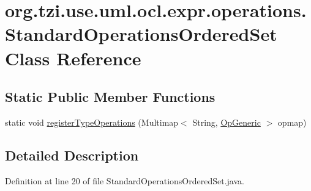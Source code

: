 \hypertarget{classorg_1_1tzi_1_1use_1_1uml_1_1ocl_1_1expr_1_1operations_1_1_standard_operations_ordered_set}{\section{org.\-tzi.\-use.\-uml.\-ocl.\-expr.\-operations.\-Standard\-Operations\-Ordered\-Set Class Reference}
\label{classorg_1_1tzi_1_1use_1_1uml_1_1ocl_1_1expr_1_1operations_1_1_standard_operations_ordered_set}
}
\subsection*{Static Public Member Functions}
\begin{DoxyCompactItemize}
\item 
static void \hyperlink{classorg_1_1tzi_1_1use_1_1uml_1_1ocl_1_1expr_1_1operations_1_1_standard_operations_ordered_set_a12a56a39d404e2d59c6a4562d38b297c}{register\-Type\-Operations} (Multimap$<$ String, \hyperlink{classorg_1_1tzi_1_1use_1_1uml_1_1ocl_1_1expr_1_1operations_1_1_op_generic}{Op\-Generic} $>$ opmap)
\end{DoxyCompactItemize}


\subsection{Detailed Description}


Definition at line 20 of file Standard\-Operations\-Ordered\-Set.\-java.



